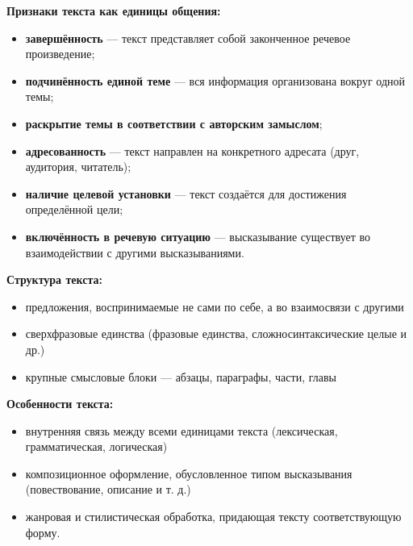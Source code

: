 \textbf{Признаки текста как единицы общения:}

\begin{itemize}
	\item \textbf{завершённость} — текст представляет собой законченное речевое произведение;
	\item \textbf{подчинённость единой теме} — вся информация организована вокруг одной темы;
	\item \textbf{раскрытие темы в соответствии с авторским замыслом};
	\item \textbf{адресованность} — текст направлен на конкретного адресата (друг, аудитория, читатель);
	\item \textbf{наличие целевой установки} — текст создаётся для достижения определённой цели;
	\item \textbf{включённость в речевую ситуацию} — высказывание существует во взаимодействии с другими высказываниями.
\end{itemize}

\textbf{Структура текста:}
\begin{itemize}
	\item предложения, воспринимаемые не сами по себе, а во взаимосвязи с другими
	\item сверхфразовые единства (фразовые единства, сложносинтаксические целые и др.)
	\item крупные смысловые блоки — абзацы, параграфы, части, главы
\end{itemize}

\textbf{Особенности текста:}
\begin{itemize}
	\item внутренняя связь между всеми единицами текста (лексическая, грамматическая, логическая)
	\item композиционное оформление, обусловленное типом высказывания (повествование, описание и т. д.)
	\item жанровая и стилистическая обработка, придающая тексту соответствующую форму.
\end{itemize}